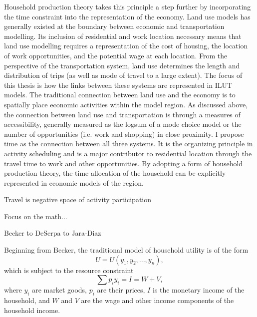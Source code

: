 Household production theory takes this principle a step further by incorporating the time constraint into the representation of the economy. Land use models has generally existed at the boundary between economic and transportation modelling. Its inclusion of residential and work location necessary means that land use modelling requires a representation of the cost of housing, the location of work opportunities, and the potential wage at each location. From the perspective of the transportation system, land use determines the length and distribution of trips (as well as mode of travel to a large extent). The focus of this thesis is how the links between these systems are represented in ILUT models. The traditional connection between land use and the economy is to spatially place economic activities within the model region. As discussed above, the connection between land use and transportation is through a measures of accessibility, generally measured as the logsum of a mode choice model or the number of opportunities (i.e. work and shopping) in close proximity. I propose time as the connection between all three systems. It is the organizing principle in activity scheduling and is a major contributor to residential location through the travel time to work and other opportunities. By adopting a form of household production theory, the time allocation of the household can be explicitly represented in economic models of the region.

Travel is negative space of activity participation

Focus on the math...

Becker to DeSerpa to Jara-Diaz

Beginning from Becker, the traditional model of household utility is of the form \cite{Becker1965}
\begin{equation}
	U = U(y_1,y_2,...,y_n),
\end{equation}
which is subject to the resource constraint \cite{Becker1965}
\begin{equation}
	\sum p_i y_i = I = W + V,
\end{equation}
where $y_i$ are market goods, $p_i$ are their prices, $I$ is the monetary income of the household, and $W$ and $V$ are the wage and other income components of the household income.

